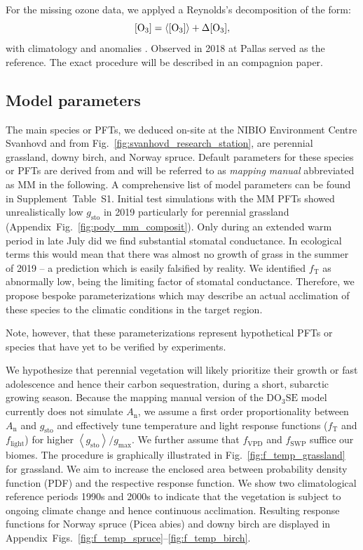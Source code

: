 \documentclass[bg, manuscript]{copernicus}
\begin{document}
For the missing ozone data, we applyed a Reynolds's decomposition of the form:
\begin{equation}
  \chem{[O_3]} = \chem{\left<[O_3]\right>} + \chem{\Delta[O_3]},
  \label{eq:reynolds_decomp}
\end{equation}
with climatology \chem{\left<[O_3]\right>} and anomalies \chem{\Delta[O_3]}. Observed \chem{[O_3]} in 2018 at Pallas served as the reference. The exact procedure will be described in an compagnion paper.

\subsection{Model parameters}
\label{subsec:do3se_parameters}

The main species or PFTs, we deduced on-site at the NIBIO Environment Centre Svanhovd and from Fig.~\ref{fig:svanhovd_research_station}, are perennial grassland, downy birch, and Norway spruce. Default parameters for these species or PFTs are derived from \citet{EP:Simpson2007,GCB:Mills2011,ICP:MappingManual2017} and will be referred to as \emph{mapping manual} abbreviated as MM in the following. A comprehensive list of model parameters can be found in Supplement~Table~S1.
Initial test simulations with the MM PFTs showed unrealistically low $g_\mathrm{sto}$ in 2019 particularly for perennial grassland (Appendix~Fig.~\ref{fig:pody_mm_composit}). Only during an extended warm period in late July did we find substantial stomatal conductance. In ecological terms this would mean that there was almost no growth of grass in the summer of 2019 -- a prediction which is easily falsified by reality. We identified $f_\mathrm{T}$ as abnormally low, being the limiting factor of stomatal conductance. Therefore, we propose bespoke parameterizations which may describe an actual acclimation of these species to the climatic conditions in the target region.

Note, however, that these parameterizations represent hypothetical PFTs or species that have yet to be verified by experiments. 

We hypothesize that perennial vegetation will likely prioritize their growth or fast adolescence and hence their carbon sequestration, during a short, subarctic growing season. Because the mapping manual version of the $\mathrm{DO_3SE}$ model currently does not simulate $A_\mathrm{n}$, we assume a first order proportionality between $A_\mathrm{n}$ and $g_\mathrm{sto}$ \citep{GCB:Medlyn2011} and effectively tune temperature and light response functions ($f_\mathrm{T}$ and $f_\mathrm{light}$) for higher $\left<g_\mathrm{sto}\right>/g_\mathrm{max}$. We further assume that $f_\mathrm{VPD}$ and $f_\mathrm{SWP}$ suffice our biomes. The procedure is graphically illustrated in Fig.~\ref{fig:f_temp_grassland} for grassland. We aim to increase the enclosed area between probability density function (PDF) and the respective response function. We show two climatological reference periods 1990s and 2000s to indicate that the vegetation is subject to ongoing climate change and hence continuous acclimation. Resulting response functions for Norway spruce (Picea abies) and downy birch are displayed in Appendix~Figs.~\ref{fig:f_temp_spruce}--\ref{fig:f_temp_birch}. 
\end{document}
